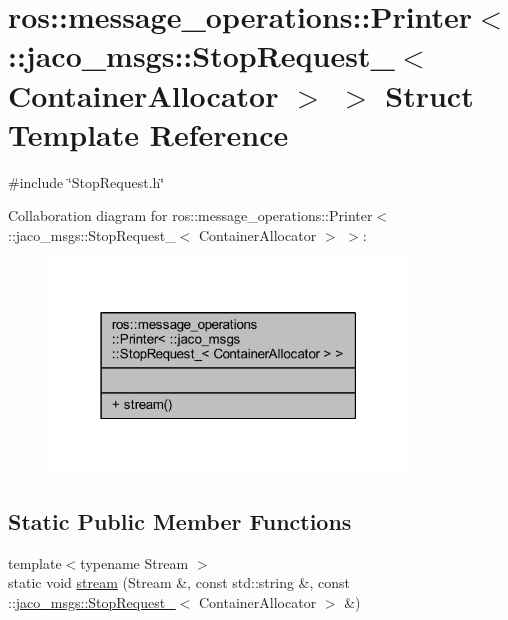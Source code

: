 \hypertarget{structros_1_1message__operations_1_1Printer_3_01_1_1jaco__msgs_1_1StopRequest___3_01ContainerAllocator_01_4_01_4}{}\section{ros\+:\+:message\+\_\+operations\+:\+:Printer$<$ \+:\+:jaco\+\_\+msgs\+:\+:Stop\+Request\+\_\+$<$ Container\+Allocator $>$ $>$ Struct Template Reference}
\label{structros_1_1message__operations_1_1Printer_3_01_1_1jaco__msgs_1_1StopRequest___3_01ContainerAllocator_01_4_01_4}


{\ttfamily \#include \char`\"{}Stop\+Request.\+h\char`\"{}}



Collaboration diagram for ros\+:\+:message\+\_\+operations\+:\+:Printer$<$ \+:\+:jaco\+\_\+msgs\+:\+:Stop\+Request\+\_\+$<$ Container\+Allocator $>$ $>$\+:
\nopagebreak
\begin{figure}[H]
\begin{center}
\leavevmode
\includegraphics[width=271pt]{dd/d23/structros_1_1message__operations_1_1Printer_3_01_1_1jaco__msgs_1_1StopRequest___3_01ContainerAllocator_01_4_01_4__coll__graph}
\end{center}
\end{figure}
\subsection*{Static Public Member Functions}
\begin{DoxyCompactItemize}
\item 
{\footnotesize template$<$typename Stream $>$ }\\static void \hyperlink{structros_1_1message__operations_1_1Printer_3_01_1_1jaco__msgs_1_1StopRequest___3_01ContainerAllocator_01_4_01_4_a75645c7eb6e98f0f44eb410c37db52a2}{stream} (Stream \&, const std\+::string \&, const \+::\hyperlink{structjaco__msgs_1_1StopRequest__}{jaco\+\_\+msgs\+::\+Stop\+Request\+\_\+}$<$ Container\+Allocator $>$ \&)
\end{DoxyCompactItemize}



